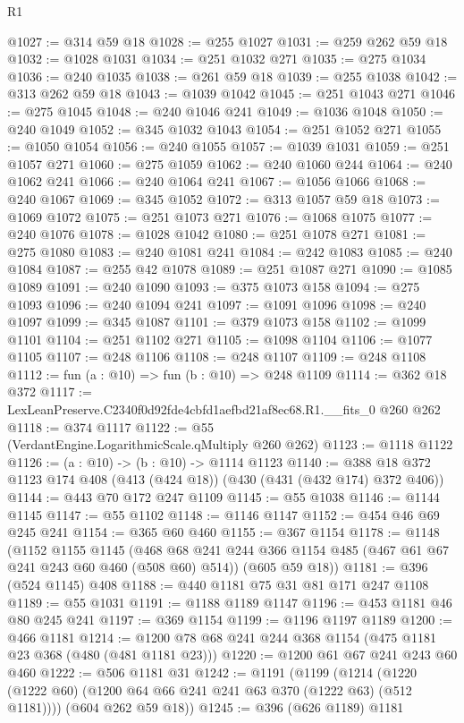 \begin{lexlean}{R1}
\begin{coremodule}
@1027 := @314 @59 @18
@1028 := @255 @1027
@1031 := @259 @262 @59 @18
@1032 := @1028 @1031
@1034 := @251 @1032 @271
@1035 := @275 @1034
@1036 := @240 @1035
@1038 := @261 @59 @18
@1039 := @255 @1038
@1042 := @313 @262 @59 @18
@1043 := @1039 @1042
@1045 := @251 @1043 @271
@1046 := @275 @1045
@1048 := @240 @1046 @241
@1049 := @1036 @1048
@1050 := @240 @1049
@1052 := @345 @1032 @1043
@1054 := @251 @1052 @271
@1055 := @1050 @1054
@1056 := @240 @1055
@1057 := @1039 @1031
@1059 := @251 @1057 @271
@1060 := @275 @1059
@1062 := @240 @1060 @244
@1064 := @240 @1062 @241
@1066 := @240 @1064 @241
@1067 := @1056 @1066
@1068 := @240 @1067
@1069 := @345 @1052
@1072 := @313 @1057 @59 @18
@1073 := @1069 @1072
@1075 := @251 @1073 @271
@1076 := @1068 @1075
@1077 := @240 @1076
@1078 := @1028 @1042
@1080 := @251 @1078 @271
@1081 := @275 @1080
@1083 := @240 @1081 @241
@1084 := @242 @1083
@1085 := @240 @1084
@1087 := @255 @42 @1078
@1089 := @251 @1087 @271
@1090 := @1085 @1089
@1091 := @240 @1090
@1093 := @375 @1073 @158
@1094 := @275 @1093
@1096 := @240 @1094 @241
@1097 := @1091 @1096
@1098 := @240 @1097
@1099 := @345 @1087
@1101 := @379 @1073 @158
@1102 := @1099 @1101
@1104 := @251 @1102 @271
@1105 := @1098 @1104
@1106 := @1077 @1105
@1107 := @248 @1106
@1108 := @248 @1107
@1109 := @248 @1108
@1112 := fun (a : @10) => fun (b : @10) => @248 @1109
@1114 := @362 @18 @372
@1117 := LexLeanPreserve.C2340f0d92fde4cbfd1aefbd21af8ec68.R1.__fits_0 @260 @262
@1118 := @374 @1117
@1122 := @55 (VerdantEngine.LogarithmicScale.qMultiply @260 @262)
@1123 := @1118 @1122
@1126 := (a : @10) -> (b : @10) -> @1114 @1123
@1140 := @388 @18 @372 @1123 @174 @408 (@413 (@424 @18)) (@430 (@431 (@432 @174) @372 @406))
@1144 := @443 @70 @172 @247 @1109
@1145 := @55 @1038
@1146 := @1144 @1145
@1147 := @55 @1102
@1148 := @1146 @1147
@1152 := @454 @46 @69 @245 @241
@1154 := @365 @60 @460
@1155 := @367 @1154
@1178 := @1148
    (@1152
      @1155
      @1145
      (@468 @68 @241 @244 @366 @1154 @485 (@467 @61 @67 @241 @243 @60 @460 (@508 @60) @514))
      (@605 @59 @18))
@1181 := @396 (@524 @1145) @408
@1188 := @440 @1181 @75 @31 @81 @171 @247 @1108
@1189 := @55 @1031
@1191 := @1188 @1189 @1147
@1196 := @453 @1181 @46 @80 @245 @241
@1197 := @369 @1154
@1199 := @1196 @1197 @1189
@1200 := @466 @1181
@1214 := @1200 @78 @68 @241 @244 @368 @1154 (@475 @1181 @23 @368 (@480 (@481 @1181 @23)))
@1220 := @1200 @61 @67 @241 @243 @60 @460
@1222 := @506 @1181 @31
@1242 := @1191
    (@1199
      (@1214 (@1220 (@1222 @60) (@1200 @64 @66 @241 @241 @63 @370 (@1222 @63) (@512 @1181))))
      (@604 @262 @59 @18))
@1245 := @396 (@626 @1189) @1181

\end{coremodule}
\end{lexlean}

